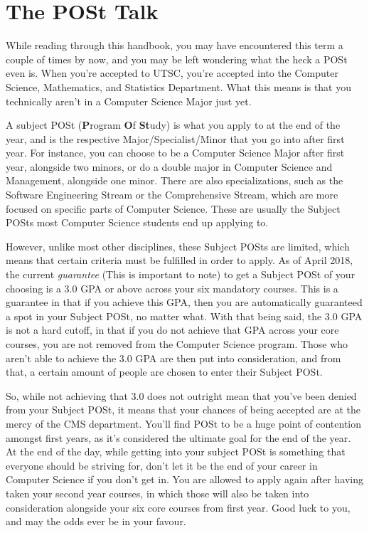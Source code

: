 \documentclass[11pt]{article}
\begin{document}
\section{The POSt Talk}
While reading through this handbook, you may have encountered this term a couple of times by now, and you may be left wondering what the heck a POSt even is.  When you're accepted to UTSC, you're accepted into the Computer Science, Mathematics, and Statistics Department.  What this means is that you technically aren't in a Computer Science Major just yet.\par
A subject POSt (\textbf{P}rogram \textbf{O}f \textbf{St}udy) is what you apply to at the end of the year, and is the respective Major/Specialist/Minor that you go into after first year.  For instance, you can choose to be a Computer Science Major after first year, alongside two minors, or do a double major in Computer Science and Management, alongside one minor.  There are also specializations, such as the Software Engineering Stream or the Comprehensive Stream, which are more focused on specific parts of Computer Science.  These are usually the Subject POSts most Computer Science students end up applying to.\par
However, unlike most other disciplines, these Subject POSts are limited, which means that certain criteria must be fulfilled in order to apply.  As of April 2018, the current \textit{guarantee} (This is important to note) to get a Subject POSt of your choosing is a 3.0 GPA or above across your six mandatory courses.  This is a guarantee in that if you achieve this GPA, then you are automatically guaranteed a spot in your Subject POSt, no matter what.  With that being said, the 3.0 GPA is not a hard cutoff, in that if you do not achieve that GPA across your core courses, you are not removed from the Computer Science program.  Those who aren't able to achieve the 3.0 GPA are then put into consideration, and from that, a certain amount of people are chosen to enter their Subject POSt.\par
So, while not achieving that 3.0 does not outright mean that you've been denied from your Subject POSt, it means that your chances of being accepted are at the mercy of the CMS department.  You'll find POSt to be a huge point of contention amongst first years, as it's considered the ultimate goal for the end of the year.  At the end of the day, while getting into your subject POSt is something that everyone should be striving for, don't let it be the end of your career in Computer Science if you don't get in.  You are allowed to apply again after having taken your second year courses, in which those will also be taken into consideration alongside your six core courses from first year.  Good luck to you, and may the odds ever be in your favour.
\end{document}
